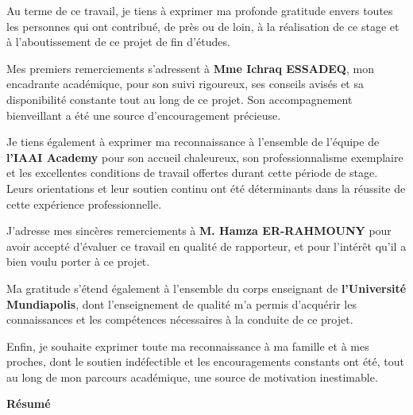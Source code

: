 \documentclass[12pt, a4paper]{report}
\begin{document}
\vspace{1cm}

\onehalfspacing
{\selectfont\fontsize{12}{18}\selectfont

Au terme de ce travail, je tiens à exprimer ma profonde gratitude envers toutes
les personnes qui ont contribué, de près ou de loin, à la réalisation de ce stage
et à l'aboutissement de ce projet de fin d'études.

Mes premiers remerciements s'adressent à \textbf{Mme Ichraq ESSADEQ}, mon
encadrante académique, pour son suivi rigoureux, ses conseils avisés et sa
disponibilité constante tout au long de ce projet. Son accompagnement bienveillant
a été une source d'encouragement précieuse.

Je tiens également à exprimer ma reconnaissance à l'ensemble de l'équipe de
\textbf{l'IAAI Academy} pour son accueil chaleureux, son professionnalisme exemplaire
et les excellentes conditions de travail offertes durant cette période de stage.
Leurs orientations et leur soutien continu ont été déterminants dans la réussite
de cette expérience professionnelle.

J'adresse mes sincères remerciements à \textbf{M. Hamza ER-RAHMOUNY} pour avoir
accepté d'évaluer ce travail en qualité de rapporteur, et pour l'intérêt qu'il a
bien voulu porter à ce projet.

Ma gratitude s'étend également à l'ensemble du corps enseignant de
\textbf{l'Université Mundiapolis}, dont l'enseignement de qualité m'a permis
d'acquérir les connaissances et les compétences nécessaires à la conduite de ce projet.

Enfin, je souhaite exprimer toute ma reconnaissance à ma famille et à mes proches,
dont le soutien indéfectible et les encouragements constants ont été, tout au long
de mon parcours académique, une source de motivation inestimable.

}

\clearpage

\begin{center}
  {\sffamily\large\bfseries Résumé}
\end{center}

\vspace{0.5cm}
\end{document}
